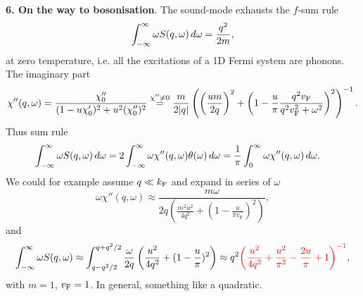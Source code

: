 \textbf{6. On the way to bosonisation}.
The sound-mode exhausts the $f$-sum rule
\begin{equation*}
	\int_{-\infty}^{\infty} \omega S(q, \omega) \, d \omega = \frac{q^2}{2m},
\end{equation*}
at zero temperature, i.e. all the excitations of a 1D Fermi system are phonons. The imaginary part
\begin{equation*}
	\chi''(q,\omega) = \frac{\chi_0''}{(1 - u \chi_0')^2 + u^2 (\chi_0'')^2} \overset{ \chi'' \neq 0}{=} \frac{m}{2|q|}  \left(
		 \left(\frac{u m}{2q}\right)^2 + \left(1 - \frac{u}{\pi} \frac{q^2 v_{\textnormal{F}}}{q^2 v_{\textnormal{F}}^2 + \omega^2}\right)^2
	\right)^{-1}.
\end{equation*}
Thus sum rule
\begin{align*}
	\int_{-\infty}^{\infty} \omega S(q, \omega) \, d \omega &= 2\int_{-\infty}^{\infty} \omega \chi''(q, \omega) \theta(\omega) \, d \omega = \frac{1}{\pi} \int_{0}^{\infty} \omega \chi''(q, \omega) \, d \omega.
\end{align*}
We could for example assume $q \ll k_{\textnormal{F}}$ and expand in series of $\omega$
\begin{equation*}
	 \omega \chi''(q, \omega) \approx \frac{m \omega }{2 q \left(\frac{m^2 u^2}{4 q^2}+\left(1-\frac{u}{\pi  v_\text{F}}\right)^2\right)},
\end{equation*}
and
\begin{equation*}
	\int_{-\infty}^{\infty} \omega S(q, \omega) \approx \int_{q - q^2/2}^{q + q^2/2}  \frac{\omega}{2 q} \left(\frac{u^2}{4q^2} + (1-\frac{u}{\pi})^2\right) \approx q^2 \textcolor{red}{\left(
		\frac{u^2}{4 q^2}+\frac{u^2}{\pi ^2}-\frac{2 u}{\pi }+1
	\right)^{-1}},
\end{equation*}
with $m=1$, $v_{\textnormal{F}}=1$.
In general, something like a quadratic. 

















